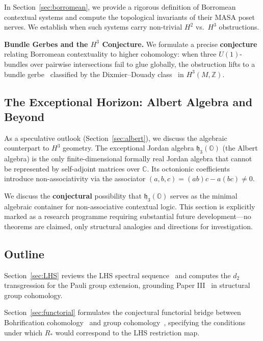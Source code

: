 \documentclass[11pt]{article}
\begin{document}
In Section~\ref{sec:borromean}, we provide a rigorous definition of Borromean contextual systems and compute the topological invariants of their MASA poset nerves. We establish when such systems carry non-trivial $H^2$ vs.~$H^3$ obstructions.

\textbf{Bundle Gerbes and the $H^3$ Conjecture.} We formulate a precise \textbf{conjecture} relating Borromean contextuality to higher cohomology: when three $U(1)$-bundles over pairwise intersections fail to glue globally, the obstruction lifts to a bundle gerbe~\cite{Murray96,Brylinski93} classified by the Dixmier--Douady class~\cite{DD63} in $H^3(M, \mathbb{Z})$.

\subsection{The Exceptional Horizon: Albert Algebra and Beyond}

As a speculative outlook (Section~\ref{sec:albert}), we discuss the algebraic counterpart to $H^3$ geometry. The exceptional Jordan algebra $\mathfrak{h}_3(\mathbb{O})$ (the Albert algebra) is the only finite-dimensional formally real Jordan algebra that cannot be represented by self-adjoint matrices over $\mathbb{C}$. Its octonionic coefficients introduce non-associativity via the associator $(a,b,c) = (ab)c - a(bc) \neq 0$.

We discuss the \textbf{conjectural} possibility that $\mathfrak{h}_3(\mathbb{O})$ serves as the minimal algebraic container for non-associative contextual logic. This section is explicitly marked as a research programme requiring substantial future development---no theorems are claimed, only structural analogies and directions for investigation.

\subsection{Outline}

Section~\ref{sec:LHS} reviews the LHS spectral sequence~\cite{HS53,Brown82} and computes the $d_2$ transgression for the Pauli group extension, grounding Paper III~\cite{PaperIII} in structural group cohomology.

Section~\ref{sec:functorial} formulates the conjectural functorial bridge between Bohrification cohomology~\cite{HLS11} and group cohomology~\cite{Brown82}, specifying the conditions under which $R_*$ would correspond to the LHS restriction map.
\end{document}
